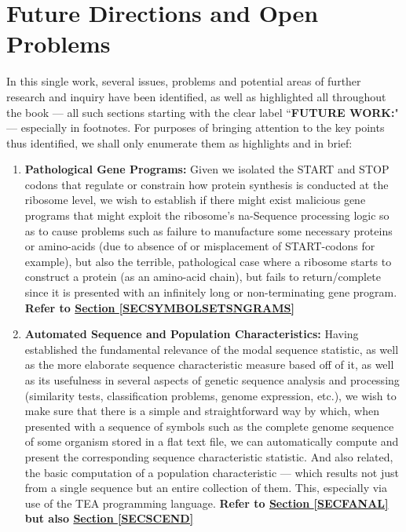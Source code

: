 \documentclass[a4paper, 18pt]{book} %
\begin{document}
\section{Future Directions and Open Problems}
\label{SECFUTUREDIRECT}

In this single work, several issues, problems and potential areas of further research and inquiry have been identified, as well as highlighted all throughout the book --- all such sections starting with the clear label ``\textbf{FUTURE WORK:}" --- especially in footnotes. For purposes of bringing attention to the key points thus identified, we shall only enumerate them as highlights and in brief:

\begin{enumerate}
\item \textbf{Pathological Gene Programs:} Given we isolated the START and STOP codons that regulate or constrain how protein synthesis is conducted at the ribosome level, we wish to establish if there might exist malicious gene programs that might exploit the ribosome's na-Sequence processing logic so as to cause problems such as failure to manufacture some necessary proteins or amino-acids (due to absence of or misplacement of START-codons for example), but also the terrible, pathological case where a ribosome starts to construct a protein (as an amino-acid chain), but fails to return/complete since it is presented with an infinitely long or non-terminating gene program. \textbf{Refer to \textbf{\hyperref[SECSYMBOLSETSNGRAMS]{Section \ref{SECSYMBOLSETSNGRAMS}}}}

\item \textbf{Automated Sequence and Population Characteristics:} Having established the fundamental relevance of the modal sequence statistic, as well as the more elaborate sequence characteristic measure based off of it, as well as its usefulness in several aspects of genetic sequence analysis and processing (similarity tests, classification problems, genome expression, etc.), we wish to make sure that there is a simple and straightforward way by which, when presented with a sequence of symbols such as the complete genome sequence of some organism stored in a flat text file, we can automatically compute and present the corresponding sequence characteristic statistic. And also related, the basic computation of a population characteristic --- which results not just from a single sequence but an entire collection of them. This, especially via use of the TEA programming language. \textbf{Refer to \textbf{\hyperref[SECFANAL]{Section \ref{SECFANAL}}} but also \textbf{\hyperref[SECSCEND]{Section \ref{SECSCEND}}}}


\end{enumerate}
\end{document}
